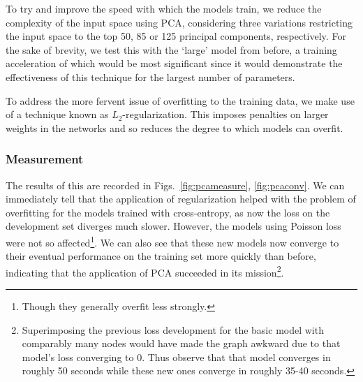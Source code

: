 \documentclass[10pt, twoside, a4paper]{article}
\begin{document}
%
	To try and improve the speed with which the models train, we reduce the complexity of the 
	input space using PCA, considering three variations restricting the input space to the top 
	50, 85 or 125 principal components, respectively. For the sake of brevity, we test this 
	with the `large' model from before, a training acceleration of which would be most 
	significant since it would demonstrate the effectiveness of this technique for the largest 
	number of parameters. 

	To address the more fervent issue of overfitting to the training data, we make use of 
	a technique known as $L_2$-regularization. This imposes penalties on larger weights in the networks and so reduces 
	the degree to which models can overfit. 

	\subsubsection{Measurement}
	
	The results of this are recorded in Figs.\ \ref{fig:pcameasure}, \ref{fig:pcaconv}. 
	We can immediately tell that the application of regularization helped with the problem of 
	overfitting for the models trained with cross-entropy, as now the loss on the development 
	set diverges much slower. However, the models using Poisson loss were not so affected\footnote{Though they generally overfit less strongly.}.
	We can also see that these new models now converge to their eventual 
	performance on the training set more quickly than before, indicating that the application 
	of PCA succeeded in its mission\footnote{Superimposing the previous loss development for
	the basic model with comparably many nodes would have made the graph awkward due to 
	that model's loss converging to 0. Thus observe that that model converges in roughly 50 seconds while these new ones converge in roughly 35-40 seconds.}.
\end{document}
